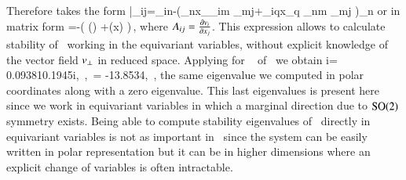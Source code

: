 Therefore  takes the form
\beq
	\bar{\Mvar}_{ij}=\Pperp_{in}-\left(\Lg_{n\ell}x_\ell \Pperp_{im} \Lg_{mj}+\Lg_{iq}x_q \Pperp_{nm} \Lg_{mj} \right)\vf_n
\eeq
or in matrix form
\beq
	\mathbf{\bar{\Mvar}}=\PperpOp {}-\left(  \left(\PperpOp \Lg\right) +\left(\Lg \cdot x\right) \otimes \left[\vf \cdot \left( \PperpOp \Lg\right)\right] \right)\,,
	\label{eq:reqvStab}
\eeq
where $A_{ij}=\frac{\partial v_i}{\partial x_j}$. This
expression allows to calculate stability of \reqva\ working
in the equivariant variables, without explicit knowledge of
the vector field  $v_\perp$ in reduced space. Applying
 for \reqv\  of \cLe\ we obtain
\beq
	\eigRe[1]\pm i\eigIm[1]= 0.0938\pm 10.1945i,\,
    ,\, \eigExp[4]= -13.8534,\, ,
\eeq
the same eigenvalue  we computed in
polar coordinates along with a zero eigenvalue.  This last
eigenvalues is present here since we work in equivariant variables
in which a marginal direction due to $\textrm{SO}(2)$ symmetry exists. Being
able to compute stability eigenvalues of \reqva\ directly in
equivariant variables is not as important in \cLe\ since the
system can be easily written in polar representation 
but it can be in higher dimensions where an
explicit change of variables is often intractable.
